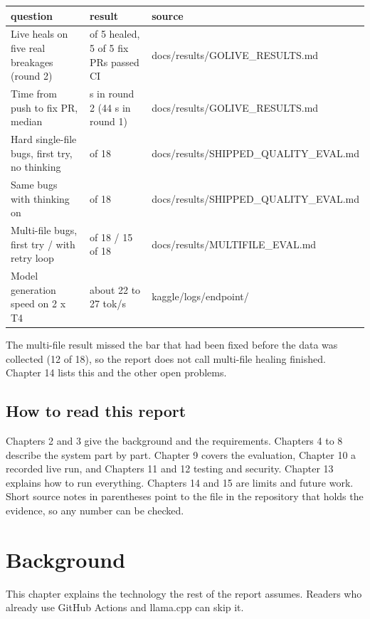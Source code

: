 \documentclass[11pt,a4paper]{report}
\begin{document}
\begin{longtable}{>{\raggedright\arraybackslash}p{0.375\dimexpr\linewidth-6\tabcolsep\relax}>{\raggedright\arraybackslash}p{0.325\dimexpr\linewidth-6\tabcolsep\relax}>{\raggedright\arraybackslash}p{0.300\dimexpr\linewidth-6\tabcolsep\relax}}
\toprule
\textbf{question} & \textbf{result} & \textbf{source} \\
\midrule
\endhead
Live heals on five real breakages (round 2) & 5 of 5 healed, 5 of 5 fix PRs passed CI & docs/results/GOLIVE\_RESULTS.md \\
Time from push to fix PR, median & 42 s in round 2 (44 s in round 1) & docs/results/GOLIVE\_RESULTS.md \\
Hard single-file bugs, first try, no thinking & 12 of 18 & docs/results/SHIPPED\_QUALITY\_EVAL.md \\
Same bugs with thinking on & 18 of 18 & docs/results/SHIPPED\_QUALITY\_EVAL.md \\
Multi-file bugs, first try / with retry loop & 9 of 18 / 15 of 18 & docs/results/MULTIFILE\_EVAL.md \\
Model generation speed on 2 x T4 & about 22 to 27 tok/s & kaggle/logs/endpoint/ \\
\bottomrule
\end{longtable}

The multi-file result missed the bar that had been fixed before the data was collected (12 of 18), so the report does not call multi-file healing finished. Chapter 14 lists this and the other open problems.

\section{How to read this report}

Chapters 2 and 3 give the background and the requirements. Chapters 4 to 8 describe the system part by part. Chapter 9 covers the evaluation, Chapter 10 a recorded live run, and Chapters 11 and 12 testing and security. Chapter 13 explains how to run everything. Chapters 14 and 15 are limits and future work. Short source notes in parentheses point to the file in the repository that holds the evidence, so any number can be checked.

\chapter{Background}

This chapter explains the technology the rest of the report assumes. Readers who already use GitHub Actions and llama.cpp can skip it.
\end{document}
